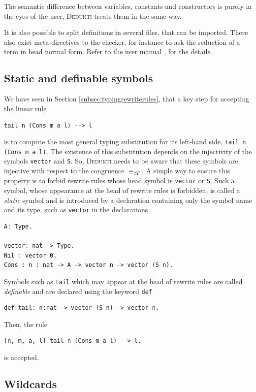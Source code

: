 \documentclass[english]{lipics}
\newcommand\eqbg{\equiv_{\beta\Gamma}}
\newcommand\lst[1]{{\rm \lstinline{#1}}}
\begin{document}
The semantic difference between variables, constants and constructors
is purely in the eyes of the user, \textsc{Dedukti} treats them in the
same way.

It is also possible to split definitions in several files, that can be
imported. There also exist meta-directives to the checker, for
instance to ask the reduction of a term in head normal form.
Refer to the user manual \cite{usermanual}, for the details.

\subsection{Static and definable symbols}

We have seen in Section \ref{subsec:typingrewriterules}, that a key step
for accepting the linear rule
\begin{center}
\lst{tail n (Cons m a l) --> l}
\end{center}
is to compute the most general typing substitution for its
left-hand side, \lst{tail n (Cons m a l)}. The existence
of this substitution depends on the injectivity of the symbols
\lst{vector} and \lst{S}. So, \textsc{Dedukti} needs to be aware
that these symbols are injective with respect to the congruence $\eqbg$.
A simple way to ensure this property is to forbid rewrite rules
whose head symbol is \lst{vector} or \lst{S}.  Such a symbol,
whose appearance at
the head of rewrite rules is forbidden, is called a \emph{static} symbol
and is introduced by a declaration containing only the symbol name and its
type, such as \lst{vector} in the declarations
\begin{lstlisting}
A: Type.

vector: nat -> Type.
Nil : vector 0.
Cons : n : nat -> A -> vector n -> vector (S n).
\end{lstlisting}
Symbols such as \lst{tail} which may appear at the head of
rewrite rules are called \emph{definable} and are declared using the keyword
\lst{def}
\begin{lstlisting}
def tail: n:nat -> vector (S n) -> vector n.
\end{lstlisting}
Then, the rule
\begin{lstlisting}
[n, m, a, l] tail n (Cons m a l) --> l.
\end{lstlisting}
is accepted.

\subsection{Wildcards}
\end{document}
